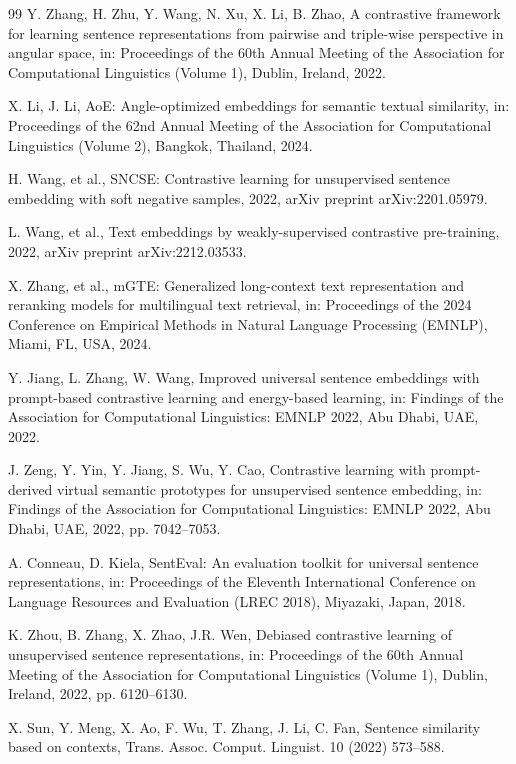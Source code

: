 \documentclass[lettersize,journal]{IEEEtran}
\begin{document}
\begin{thebibliography}{99}
Y. Zhang, H. Zhu, Y. Wang, N. Xu, X. Li, B. Zhao, A contrastive framework for learning sentence representations from pairwise and triple-wise perspective in angular space, in: Proceedings of the 60th Annual Meeting of the Association for Computational Linguistics (Volume 1), Dublin, Ireland, 2022.

X. Li, J. Li, AoE: Angle-optimized embeddings for semantic textual similarity, in: Proceedings of the 62nd Annual Meeting of the Association for Computational Linguistics (Volume 2), Bangkok, Thailand, 2024.

H. Wang, et al., SNCSE: Contrastive learning for unsupervised sentence embedding with soft negative samples, 2022, arXiv preprint arXiv:2201.05979.

L. Wang, et al., Text embeddings by weakly-supervised contrastive pre-training, 2022, arXiv preprint arXiv:2212.03533.

X. Zhang, et al., mGTE: Generalized long-context text representation and reranking models for multilingual text retrieval, in: Proceedings of the 2024 Conference on Empirical Methods in Natural Language Processing (EMNLP), Miami, FL, USA, 2024.

Y. Jiang, L. Zhang, W. Wang, Improved universal sentence embeddings with prompt-based contrastive learning and energy-based learning, in: Findings of the Association for Computational Linguistics: EMNLP 2022, Abu Dhabi, UAE, 2022.

J. Zeng, Y. Yin, Y. Jiang, S. Wu, Y. Cao, Contrastive learning with prompt-derived virtual semantic prototypes for unsupervised sentence embedding, in: Findings of the Association for Computational Linguistics: EMNLP 2022, Abu Dhabi, UAE, 2022, pp. 7042--7053.

A. Conneau, D. Kiela, SentEval: An evaluation toolkit for universal sentence representations, in: Proceedings of the Eleventh International Conference on Language Resources and Evaluation (LREC 2018), Miyazaki, Japan, 2018.

K. Zhou, B. Zhang, X. Zhao, J.R. Wen, Debiased contrastive learning of unsupervised sentence representations, in: Proceedings of the 60th Annual Meeting of the Association for Computational Linguistics (Volume 1), Dublin, Ireland, 2022, pp. 6120--6130.

X. Sun, Y. Meng, X. Ao, F. Wu, T. Zhang, J. Li, C. Fan, Sentence similarity based on contexts, Trans. Assoc. Comput. Linguist. 10 (2022) 573--588.


\end{thebibliography}
\end{document}
